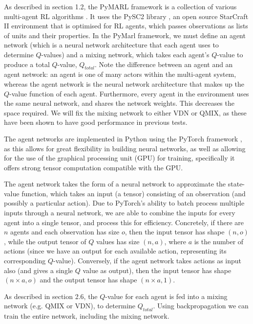 As described in section 1.2, the PyMARL framework is a collection of various multi-agent RL algorithms . It uses the PySC2 library \cite{pysc2}, an open source StarCraft II environment that is optimised for RL agents, which passes observations as lists of units and their properties. In the PyMarl framework, we must define an agent network (which is a neural network architecture that each agent uses to determine $Q$-values) and a mixing network, which takes each agent's $Q$-value to produce a total $Q$-value, $Q_{total}$. Note the difference between an agent and an agent network: an agent is one of many actors within the multi-agent system, whereas the agent network is the neural network architecture that makes up the $Q$-value function of each agent. Furthermore, every agent in the environment uses the same neural network, and shares the network weights. This decreases the space required. We will fix the mixing network to either VDN or QMIX, as these have been shown to have good performance in previous tests. 

The agent networks are implemented in Python using the PyTorch framework \cite{pytorch}, as this allows for great flexibility in building neural networks, as well as allowing for the use of the graphical processing unit (GPU) for training, specifically it offers strong tensor computation compatible with the GPU.

The agent network takes the form of a neural network to approximate the state-value function, which takes an input (a tensor) consisting of an observation (and possibly a particular action). Due to PyTorch's ability to batch process multiple inputs through a neural network, we are able to combine the inputs for every agent into a single tensor, and process this for efficiency. Concretely, if there are $n$ agents and each observation has size $o$, then the input tensor has shape $(n, o)$, while the output tensor of $Q$ values has size $(n, a)$, where $a$ is the number of actions (since we have an output for each available action, representing its corresponding $Q$-value). Conversely, if the agent network takes actions as input also (and gives a single $Q$ value as output), then the input tensor has shape $(n \times a, o)$ and the output tensor has shape $(n \times a, 1)$.

As described in section 2.6, the $Q$-value for each agent is fed into a mixing network (e.g. QMIX or VDN), to determine $Q_{total}$. Using backpropagation we can train the entire network, including the mixing network.

